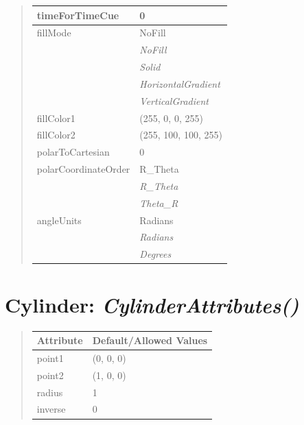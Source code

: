 \documentclass[letterpaper,10pt,english]{sphinxmanual}
\begin{document}
\begin{quote}
\begin{longtable}{|l|l|}
\hline
timeForTimeCue
 & 
0
\\
\hline
fillMode
 & 
NoFill
\\
\hline & 
\emph{NoFill}
\\
\hline & 
\emph{Solid}
\\
\hline & 
\emph{HorizontalGradient}
\\
\hline & 
\emph{VerticalGradient}
\\
\hline
fillColor1
 & 
(255, 0, 0, 255)
\\
\hline
fillColor2
 & 
(255, 100, 100, 255)
\\
\hline
polarToCartesian
 & 
0
\\
\hline
polarCoordinateOrder
 & 
R\_Theta
\\
\hline & 
\emph{R\_Theta}
\\
\hline & 
\emph{Theta\_R}
\\
\hline
angleUnits
 & 
Radians
\\
\hline & 
\emph{Radians}
\\
\hline & 
\emph{Degrees}
\\
\hline\end{longtable}

\end{quote}

\begin{DUlineblock}{0em}
\item[] 
\end{DUlineblock}

\begin{DUlineblock}{0em}
\item[] 
\end{DUlineblock}


\section{\textbf{Cylinder}: \emph{CylinderAttributes()}}
\label{attributes:cylinder-cylinderattributes}
\begin{DUlineblock}{0em}
\item[] 
\end{DUlineblock}
\begin{quote}

\begin{tabulary}{\linewidth}{|L|L|}
\hline

\textbf{Attribute}
 & 
\textbf{Default/Allowed Values}
\\
\hline
point1
 & 
(0, 0, 0)
\\
\hline
point2
 & 
(1, 0, 0)
\\
\hline
radius
 & 
1
\\
\hline
inverse
 & 
0
\\
\hline\end{tabulary}

\end{quote}
\end{document}
